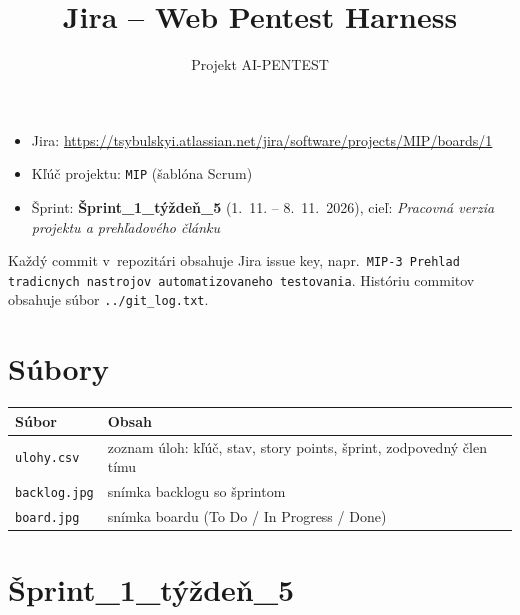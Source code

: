 \documentclass[11pt,a4paper]{article}
\title{Jira -- Web Pentest Harness}
\author{Projekt AI-PENTEST}
\date{}
\begin{document}
\maketitle

\begin{itemize}
  \item Jira: \url{https://tsybulskyi.atlassian.net/jira/software/projects/MIP/boards/1}
  \item Kľúč projektu: \texttt{MIP} (šablóna Scrum)
  \item Šprint: \textbf{Šprint\_1\_týždeň\_5} (1.~11. -- 8.~11.~2026), cieľ: \emph{Pracovná verzia projektu a prehľadového článku}
\end{itemize}

Každý commit v~repozitári obsahuje Jira issue key, napr.\ \texttt{MIP-3 Prehlad tradicnych nastrojov automatizovaneho testovania}. Históriu commitov obsahuje súbor \texttt{../git\_log.txt}.

\section*{Súbory}

\begin{tabularx}{\textwidth}{@{}lX@{}}
\toprule
\textbf{Súbor} & \textbf{Obsah} \\ \midrule
\texttt{ulohy.csv} & zoznam úloh: kľúč, stav, story points, šprint, zodpovedný člen tímu \\
\texttt{backlog.jpg} & snímka backlogu so šprintom \\
\texttt{board.jpg} & snímka boardu (To Do / In Progress / Done) \\ \bottomrule
\end{tabularx}

\section*{Šprint\_1\_týždeň\_5}
\end{document}
